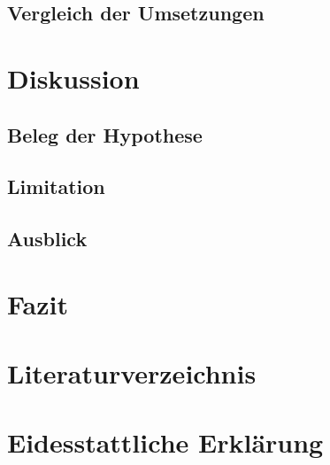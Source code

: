 \documentclass[a4paper]{scrartcl}
\begin{document}
 
\subsection{Vergleich der Umsetzungen}

\section{Diskussion}

\subsection{Beleg der Hypothese}

\subsection{Limitation}

\subsection{Ausblick}

\section{Fazit}


\newpage


\setcounter{page}{6}


\section*{Literaturverzeichnis}

\singlespacing


\printbibliography[heading=none]

\newpage


\section*{Eidesstattliche Erklärung}
\end{document}
